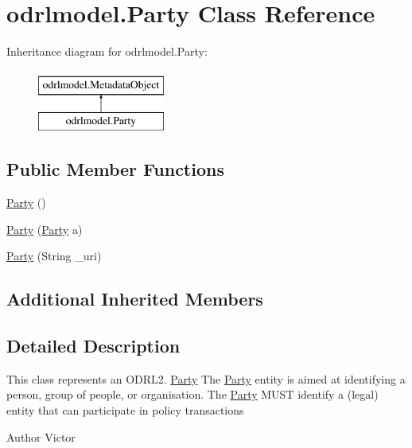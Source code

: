 \hypertarget{classodrlmodel_1_1_party}{\section{odrlmodel.\-Party Class Reference}
\label{classodrlmodel_1_1_party}
}
Inheritance diagram for odrlmodel.\-Party\-:\begin{figure}[H]
\begin{center}
\leavevmode
\includegraphics[height=2.000000cm]{classodrlmodel_1_1_party}
\end{center}
\end{figure}
\subsection*{Public Member Functions}
\begin{DoxyCompactItemize}
\item 
\hyperlink{classodrlmodel_1_1_party_a8625ab95a1c49e20d7d9881c0712cbd3}{Party} ()
\item 
\hyperlink{classodrlmodel_1_1_party_a4ac7aad2d6c9d3e5311799432bf59e02}{Party} (\hyperlink{classodrlmodel_1_1_party}{Party} a)
\item 
\hyperlink{classodrlmodel_1_1_party_adcc45332781273d7910daa6cb66a6be1}{Party} (String \-\_\-uri)
\end{DoxyCompactItemize}
\subsection*{Additional Inherited Members}


\subsection{Detailed Description}
This class represents an O\-D\-R\-L2. \hyperlink{classodrlmodel_1_1_party}{Party} The \hyperlink{classodrlmodel_1_1_party}{Party} entity is aimed at identifying a person, group of people, or organisation. The \hyperlink{classodrlmodel_1_1_party}{Party} M\-U\-S\-T identify a (legal) entity that can participate in policy transactions \begin{DoxyAuthor}{Author}
Victor 
\end{DoxyAuthor}


